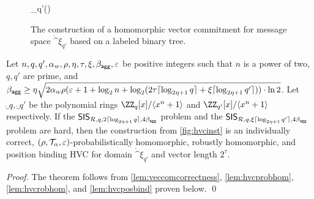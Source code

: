 \begin{figure}[t]
\begin{pcvstack}
\begin{pchstack}[center]
{    \pcreturn \proj_{q'}()
  }
\end{pchstack}
  \pcvspace
\begin{pchstack}
    \pchspace
    \pchspace
\end{pchstack}
\end{pcvstack}
\caption{The construction of a homomorphic vector commitment for message space $\ring^\xi_{q'}$ based on a labeled binary tree.}
\label{fig:hvcinst}
\end{figure}

\begin{theorem}\label{theo:veccom}
  Let $n,q,q',\alpha_w,\rho,\eta,\tau,\xi,\beta_{\mathsf{agg}},\varepsilon$ be positive integers such that $n$ is a power of two, $q,q'$ are prime, and $\beta_{\mathsf{agg}} \geq \eta\sqrt{2\alpha_w\rho(\varepsilon+1+\log_2 n + \log_2(2\tau \lceil\log_{2\eta+1}q\rceil + \xi\lceil\log_{2\eta+1}q'\rceil))\cdot\ln2}$.
  Let $\ring_q,\ring_{q'}$ be the polynomial rings $\ZZ_q[x]/\langle x^n+1\rangle$ and $\ZZ_{q'}[x]/\langle x^n+1\rangle$ respectively.
  If the $\mathsf{SIS}_{\mathcal{R},q,2\lceil \log_{2\eta+1} q \rceil,4\beta_{\mathsf{agg}}}$ problem and the $\mathsf{SIS}_{\mathcal{R},q,\xi\lceil \log_{2\eta+1} q' \rceil,4\beta_{\mathsf{agg}}}$ problem are hard, then the construction from \autoref{fig:hvcinst} is an individually correct, $(\rho,\mathcal{T}_\alpha,\varepsilon)$-probabilistically homomorphic, robustly homomorphic, and position binding HVC for domain $\ring^{\xi}_{q'}$ and vector length $2^\tau$.
\end{theorem}
\begin{proof}
  The theorem follows from \autoref{lem:veccomcorrectness}, \autoref{lem:hvcprobhom}, \autoref{lem:hvcrobhom}, and \autoref{lem:hvcposbind} proven below. \qed
\end{proof}

